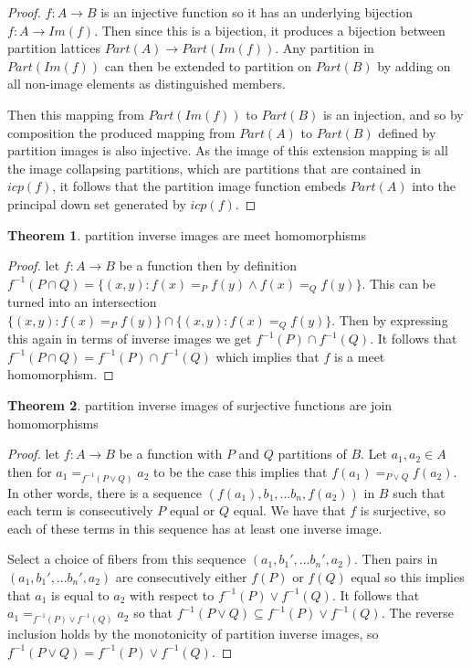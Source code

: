 \documentclass[a4paper,11pt, notitlepage]{report}
\theoremstyle{definition}
\newtheorem{theorem}{Theorem}[section]
\begin{document}
\begin{proof}
$f: A \to B$ is an injective function so it has an underlying bijection $f: A \to Im(f)$. Then since this is a bijection, it produces a bijection between partition lattices $Part(A) \to Part(Im(f))$. Any partition in $Part(Im(f))$ can then be extended to partition on $Part(B)$ by adding on all non-image elements as distinguished members.

Then this mapping from $Part(Im(f))$ to $Part(B)$ is an injection, and so by composition the produced mapping from $Part(A)$ to $Part(B)$ defined by partition images is also injective. As the image of this extension mapping is all the image collapsing partitions, which are partitions that are contained in $icp(f)$, it follows that the partition image function embeds $Part(A)$ into the principal down set generated by $icp(f)$.
\end{proof}

\begin{theorem}
partition inverse images are meet homomorphisms
\end{theorem}

\begin{proof}
let $f: A \to B$ be a function then by definition $f^{-1}(P \cap Q) = \{(x,y) : f(x) =_P f(y) \land f(x) =_Q f(y) \}$. This can be turned into an intersection $\{(x,y) : f(x) =_P f(y) \} \cap \{(x,y) : f(x) =_Q f(y)\}$. Then by expressing this again in terms of inverse images we get $f^{-1}(P) \cap f^{-1}(Q)$. It follows that $f^{-1}(P \cap Q) = f^{-1}(P) \cap f^{-1}(Q)$ which implies that $f$ is a meet homomorphism.
\end{proof}

\begin{theorem}
partition inverse images of surjective functions are join homomorphisms
\end{theorem}

\begin{proof}
let $f: A \to B$ be a function with $P$ and $Q$ partitions of $B$. Let $a_1,a_2 \in A$ then for $a_1 =_{f^{-1}(P \vee Q)} a_2$ to be the case this implies that $f(a_1) =_{P \vee Q} f(a_2)$. In other words, there is a sequence $(f(a_1),b_1,...b_n,f(a_2))$ in $B$ such that each term is consecutively $P$ equal or $Q$ equal. We have that $f$ is surjective, so each of these terms in this sequence has at least one inverse image.

Select a choice of fibers from this sequence $(a_1,b_1',...b_n',a_2)$. Then pairs in $(a_1,b_1',...b_n',a_2)$ are consecutively either $f(P)$ or $f(Q)$ equal so this implies that $a_1$ is equal to $a_2$ with respect to $f^{-1}(P) \vee f^{-1}(Q)$. It follows that $a_1 = _{f^{-1}(P) \vee f^{-1}(Q)} a_2$ so that $f^{-1}(P \vee Q) \subseteq f^{-1}(P) \vee f^{-1}(Q)$. The reverse inclusion holds by the monotonicity of partition inverse images, so $f^{-1}(P \vee Q) = f^{-1}(P) \vee f^{-1}(Q)$.
\end{proof}
\end{document}
